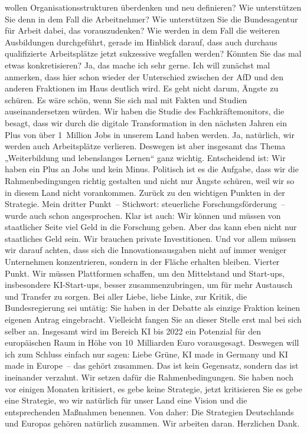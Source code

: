 \documentclass{article}
\begin{document}
wollen Organisationsstrukturen überdenken und neu definieren?  Wie unterstützen Sie denn in dem Fall die Arbeitnehmer? Wie unterstützen Sie die Bundesagentur für Arbeit dabei, das vorauszudenken? Wie werden in dem Fall die weiteren Ausbildungen durchgeführt, gerade im Hinblick darauf, dass auch durchaus qualifizierte Arbeitsplätze jetzt sukzessive wegfallen werden? Könnten Sie das mal etwas konkretisieren? Ja, das mache ich sehr gerne. Ich will zunächst mal anmerken, dass hier schon wieder der Unterschied zwischen der AfD und den anderen Fraktionen im Haus deutlich wird. Es geht nicht darum, Ängste zu schüren. Es wäre schön, wenn Sie sich mal mit Fakten und Studien auseinandersetzen würden. Wir haben die Studie des Fachkräftemonitors, die besagt, dass wir durch die digitale Transformation in den nächsten Jahren ein Plus von über 1 Million Jobs in unserem Land haben werden. Ja, natürlich, wir werden auch Arbeitsplätze verlieren. Deswegen ist aber insgesamt das Thema „Weiterbildung und lebenslanges Lernen“ ganz wichtig.  Entscheidend ist: Wir haben ein Plus an Jobs und kein Minus. Politisch ist es die Aufgabe, dass wir die Rahmenbedingungen richtig gestalten und nicht nur Ängste schüren, weil wir so in diesem Land nicht vorankommen.  Zurück zu den wichtigen Punkten in der Strategie. Mein dritter Punkt – Stichwort: steuerliche Forschungsförderung – wurde auch schon angesprochen. Klar ist auch: Wir können und müssen von staatlicher Seite viel Geld in die Forschung geben. Aber das kann eben nicht nur staatliches Geld sein. Wir brauchen private Investitionen. Und vor allem müssen wir darauf achten, dass sich die Innovationsausgaben nicht auf immer weniger Unternehmen konzentrieren, sondern in der Fläche erhalten bleiben. Vierter Punkt. Wir müssen Plattformen schaffen, um den Mittelstand und Start-ups, insbesondere KI-Start-ups, besser zusammenzubringen, um für mehr Austausch und Transfer zu sorgen. Bei aller Liebe, liebe Linke, zur Kritik, die Bundesregierung sei untätig: Sie haben in der Debatte als einzige Fraktion keinen eigenen Antrag eingebracht. Vielleicht fangen Sie an dieser Stelle erst mal bei sich selber an.  Insgesamt wird im Bereich KI bis 2022 ein Potenzial für den europäischen Raum in Höhe von 10 Milliarden Euro vorausgesagt. Deswegen will ich zum Schluss einfach nur sagen: Liebe Grüne, KI made in Germany und KI made in Europe – das gehört zusammen. Das ist kein Gegensatz, sondern das ist ineinander verzahnt.  Wir setzen dafür die Rahmenbedingungen. Sie haben noch vor einigen Monaten kritisiert, es gebe keine Strategie, jetzt kritisieren Sie es gebe eine Strategie, wo wir natürlich für unser Land eine Vision und die entsprechenden Maßnahmen benennen. Von daher: Die Strategien Deutschlands und Europas gehören natürlich zusammen. Wir arbeiten daran. Herzlichen Dank. 
\end{document}
